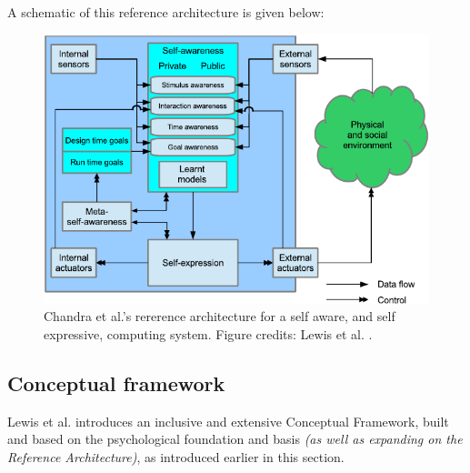 	A schematic of this reference architecture is given below:

	\begin{figure}[!htp]
		\centering
		\includegraphics[width=0.9\columnwidth]{Assets/DocSegments/Chapters/Background/Figures/Schema/SA_and_SE_architecture.pdf}
		\caption[A rererence architecture for a self aware, and self expressive, computing system.]{Chandra et al.'s \cite{sacs16_ch4} rererence architecture for a self aware, and self expressive, computing system. Figure credits: Lewis et al. \cite{sacs16_ch4}.}
	\end{figure}


	\subsection{Conceptual framework}
	\label{conceptual_SA_framework}

	Lewis et al. \cite{sacs17_ch3} introduces an inclusive and extensive Conceptual Framework, built and based on the psychological foundation and basis \textit{(as well as expanding on the Reference Architecture)}, as introduced earlier in this section.

